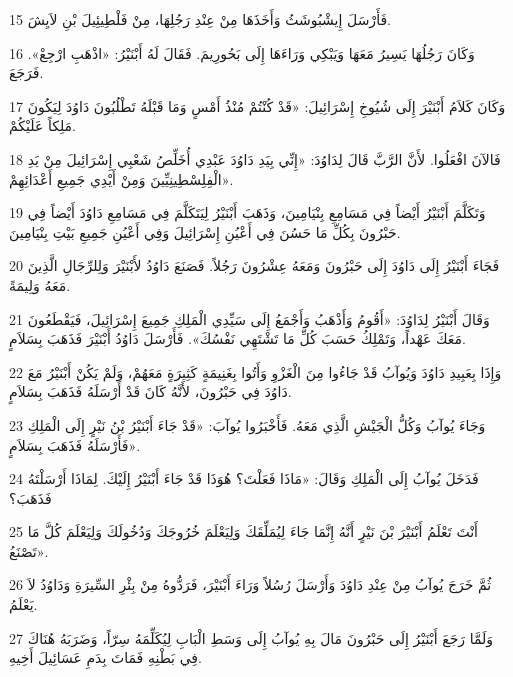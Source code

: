 \par 15 فَأَرْسَلَ إِيشْبُوشَثُ وَأَخَذَهَا مِنْ عِنْدِ رَجُلِهَا، مِنْ فَلْطِيئِيلَ بْنِ لاَيِشَ.
\par 16 وَكَانَ رَجُلُهَا يَسِيرُ مَعَهَا وَيَبْكِي وَرَاءَهَا إِلَى بَحُورِيمَ. فَقَالَ لَهُ أَبْنَيْرُ: «اذْهَبِ ارْجِعْ». فَرَجَعَ.
\par 17 وَكَانَ كَلاَمُ أَبْنَيْرَ إِلَى شُيُوخِ إِسْرَائِيلَ: «قَدْ كُنْتُمْ مُنْذُ أَمْسٍ وَمَا قَبْلَهُ تَطْلُبُونَ دَاوُدَ لِيَكُونَ مَلِكاً عَلَيْكُمْ.
\par 18 فَالآنَ افْعَلُوا. لأَنَّ الرَّبَّ قَالَ لِدَاوُدَ: «إِنِّي بِيَدِ دَاوُدَ عَبْدِي أُخَلِّصُ شَعْبِي إِسْرَائِيلَ مِنْ يَدِ الْفِلِسْطِينِيِّينَ وَمِنْ أَيْدِي جَمِيعِ أَعْدَائِهِمْ».
\par 19 وَتَكَلَّمَ أَبْنَيْرُ أَيْضاً فِي مَسَامِعِ بِنْيَامِينَ، وَذَهَبَ أَبْنَيْرُ لِيَتَكَلَّمَ فِي مَسَامِعِ دَاوُدَ أَيْضاً فِي حَبْرُونَ بِكُلِّ مَا حَسُنَ فِي أَعْيُنِ إِسْرَائِيلَ وَفِي أَعْيُنِ جَمِيعِ بَيْتِ بِنْيَامِينَ.
\par 20 فَجَاءَ أَبْنَيْرُ إِلَى دَاوُدَ إِلَى حَبْرُونَ وَمَعَهُ عِشْرُونَ رَجُلاً. فَصَنَعَ دَاوُدُ لأَبْنَيْرَ وَلِلرِّجَالِ الَّذِينَ مَعَهُ وَلِيمَةً.
\par 21 وَقَالَ أَبْنَيْرُ لِدَاوُدَ: «أَقُومُ وَأَذْهَبُ وَأَجْمَعُ إِلَى سَيِّدِي الْمَلِكِ جَمِيعَ إِسْرَائِيلَ، فَيَقْطَعُونَ مَعَكَ عَهْداً، وَتَمْلِكُ حَسَبَ كُلِّ مَا تَشْتَهِي نَفْسُكَ». فَأَرْسَلَ دَاوُدُ أَبْنَيْرَ فَذَهَبَ بِسَلاَمٍ.
\par 22 وَإِذَا بِعَبِيدِ دَاوُدَ وَيُوآبُ قَدْ جَاءُوا مِنَ الْغَزْوِ وَأَتُوا بِغَنِيمَةٍ كَثِيرَةٍ مَعَهُمْ، وَلَمْ يَكُنْ أَبْنَيْرُ مَعَ دَاوُدَ فِي حَبْرُونَ، لأَنَّهُ كَانَ قَدْ أَرْسَلَهُ فَذَهَبَ بِسَلاَمٍ.
\par 23 وَجَاءَ يُوآبُ وَكُلُّ الْجَيْشِ الَّذِي مَعَهُ. فَأَخْبَرُوا يُوآبَ: «قَدْ جَاءَ أَبْنَيْرُ بْنُ نَيْرٍ إِلَى الْمَلِكِ فَأَرْسَلَهُ فَذَهَبَ بِسَلاَمٍ».
\par 24 فَدَخَلَ يُوآبُ إِلَى الْمَلِكِ وَقَالَ: «مَاذَا فَعَلْتَ؟ هُوَذَا قَدْ جَاءَ أَبْنَيْرُ إِلَيْكَ. لِمَاذَا أَرْسَلْتَهُ فَذَهَبَ؟
\par 25 أَنْتَ تَعْلَمُ أَبْنَيْرَ بْنَ نَيْرٍ أَنَّهُ إِنَّمَا جَاءَ لِيُمَلِّقَكَ وَلِيَعْلَمَ خُرُوجَكَ وَدُخُولَكَ وَلِيَعْلَمَ كُلَّ مَا تَصْنَعُ».
\par 26 ثُمَّ خَرَجَ يُوآبُ مِنْ عِنْدِ دَاوُدَ وَأَرْسَلَ رُسُلاً وَرَاءَ أَبْنَيْرَ، فَرَدُّوهُ مِنْ بِئْرِ السِّيرَةِ وَدَاوُدُ لاَ يَعْلَمُ.
\par 27 وَلَمَّا رَجَعَ أَبْنَيْرُ إِلَى حَبْرُونَ مَالَ بِهِ يُوآبُ إِلَى وَسَطِ الْبَابِ لِيُكَلِّمَهُ سِرّاً، وَضَرَبَهُ هُنَاكَ فِي بَطْنِهِ فَمَاتَ بِدَمِ عَسَائِيلَ أَخِيهِ.
